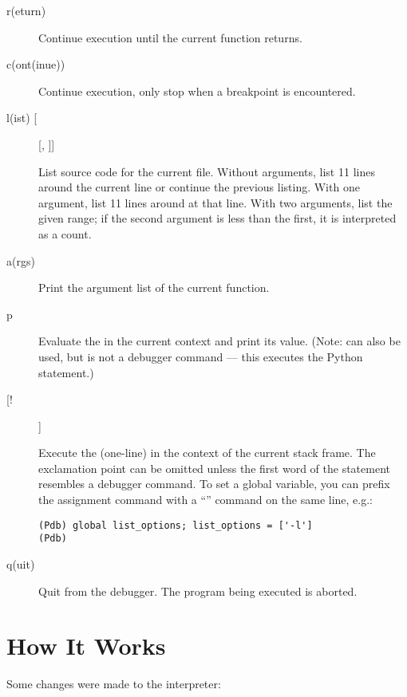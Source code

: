 \begin{description}
\item[r(eturn)]

Continue execution until the current function returns.

\item[c(ont(inue))]

Continue execution, only stop when a breakpoint is encountered.

\item[l(ist) [] [, ]]

List source code for the current file.  Without arguments, list 11
lines around the current line or continue the previous listing.  With
one argument, list 11 lines around at that line.  With two arguments,
list the given range; if the second argument is less than the first,
it is interpreted as a count.

\item[a(rgs)]

Print the argument list of the current function.

\item[p ]

Evaluate the  in the current context and print its
value.  (Note:  can also be used, but is not a debugger
command --- this executes the Python  statement.)

\item[[!] ]

Execute the (one-line)  in the context of
the current stack frame.
The exclamation point can be omitted unless the first word
of the statement resembles a debugger command.
To set a global variable, you can prefix the assignment
command with a ``'' command on the same line, e.g.:
\begin{verbatim}
(Pdb) global list_options; list_options = ['-l']
(Pdb)
\end{verbatim}

\item[q(uit)]

Quit from the debugger.
The program being executed is aborted.

\end{description}

\section{How It Works}

Some changes were made to the interpreter:

